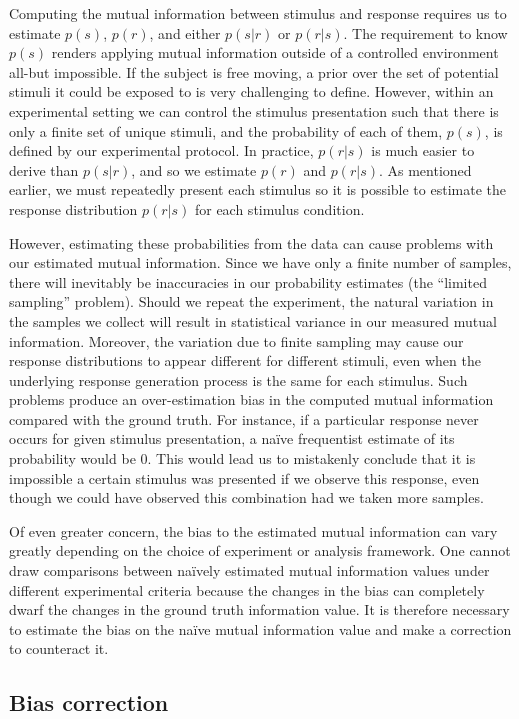 Computing the mutual information between stimulus and response requires us to estimate $p(s)$, $p(r)$, and either $p(s|r)$ or $p(r|s)$.
The requirement to know $p(s)$ renders applying mutual information outside of a controlled environment all-but impossible.
If the subject is free moving, a prior over the set of potential stimuli it could be exposed to is very challenging to define.
However, within an experimental setting we can control the stimulus presentation such that there is only a finite set of unique stimuli, and the probability of each of them, $p(s)$, is defined by our experimental protocol.
In practice, $p(r|s)$ is much easier to derive than $p(s|r)$, and so we estimate $p(r)$ and $p(r|s)$.
As mentioned earlier, we must repeatedly present each stimulus so it is possible to estimate the response distribution $p(r|s)$ for each stimulus condition.

However, estimating these probabilities from the data can cause problems with our estimated mutual information.
Since we have only a finite number of samples, there will inevitably be inaccuracies in our probability estimates (the ``limited sampling'' problem).
Should we repeat the experiment, the natural variation in the samples we collect will result in statistical variance in our measured mutual information.
Moreover, the variation due to finite sampling may cause our response distributions to appear different for different stimuli, even when the underlying response generation process is the same for each stimulus.
Such problems produce an over-estimation bias in the computed mutual information compared with the ground truth.
For instance, if a particular response never occurs for given stimulus presentation, a na{\"i}ve frequentist estimate of its probability would be $0$.
This would lead us to mistakenly conclude that it is impossible a certain stimulus was presented if we observe this response, even though we could have observed this combination had we taken more samples.

Of even greater concern, the bias to the estimated mutual information can vary greatly depending on the choice of experiment or analysis framework.
One cannot draw comparisons between na{\"i}vely estimated mutual information values under different experimental criteria because the changes in the bias can completely dwarf the changes in the ground truth information value.
It is therefore necessary to estimate the bias on the na{\"i}ve mutual information value and make a correction to counteract it.


\subsection{Bias correction}
\label{sec:info-bias}

